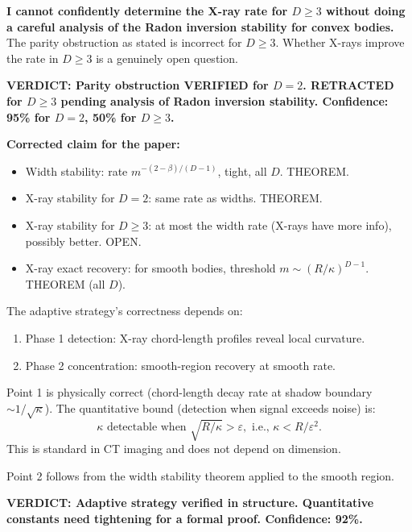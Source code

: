\textbf{I cannot confidently determine the X-ray rate for $D \geq 3$ without doing a careful analysis of the Radon inversion stability for convex bodies.} The parity obstruction as stated is incorrect for $D \geq 3$. Whether X-rays improve the rate in $D \geq 3$ is a genuinely open question.

\textbf{VERDICT: Parity obstruction VERIFIED for $D = 2$. RETRACTED for $D \geq 3$ pending analysis of Radon inversion stability. Confidence: 95\% for $D=2$, 50\% for $D \geq 3$.}

\textbf{Corrected claim for the paper:}
\begin{itemize}
  \item Width stability: rate $m^{-(2-\beta)/(D-1)}$, tight, all $D$. THEOREM.
  \item X-ray stability for $D = 2$: same rate as widths. THEOREM.
  \item X-ray stability for $D \geq 3$: at most the width rate (X-rays have more info), possibly better. OPEN.
  \item X-ray exact recovery: for smooth bodies, threshold $m \sim (R/\kappa)^{D-1}$. THEOREM (all $D$).
\end{itemize}



The adaptive strategy's correctness depends on:
\begin{enumerate}
  \item Phase 1 detection: X-ray chord-length profiles reveal local curvature.
  \item Phase 2 concentration: smooth-region recovery at smooth rate.
\end{enumerate}

Point 1 is physically correct (chord-length decay rate at shadow boundary $\sim 1/\sqrt{\kappa}$). The quantitative bound (detection when signal exceeds noise) is:
\[
  \kappa \text{ detectable when } \sqrt{R/\kappa} > \varepsilon, \text{ i.e., } \kappa < R/\varepsilon^2.
\]
This is standard in CT imaging and does not depend on dimension.

Point 2 follows from the width stability theorem applied to the smooth region.

\textbf{VERDICT: Adaptive strategy verified in structure. Quantitative constants need tightening for a formal proof. Confidence: 92\%.}


